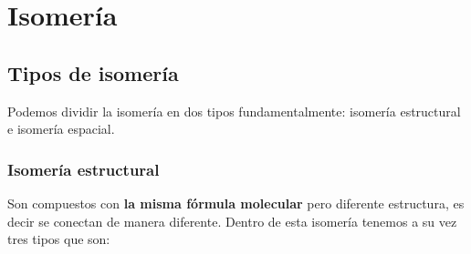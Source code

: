
\section{Isomería}


\subsection{Tipos de isomería}

Podemos dividir la isomería en dos tipos fundamentalmente: isomería estructural e isomería espacial.

\subsubsection{Isomería estructural}

Son compuestos con \textbf{la misma fórmula molecular} pero diferente estructura, es decir se conectan de manera diferente. Dentro de esta isomería tenemos a su vez tres tipos que son:


